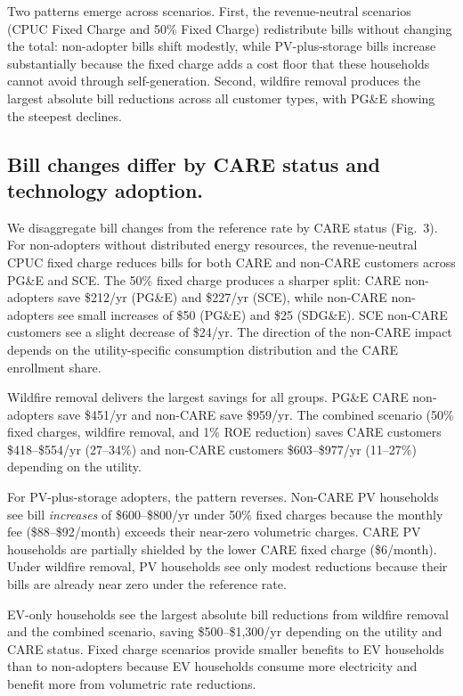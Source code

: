 \documentclass[11pt]{article}
\begin{document}
Two patterns emerge across scenarios. First, the revenue-neutral scenarios (CPUC Fixed Charge and 50\% Fixed Charge) redistribute bills without changing the total: non-adopter bills shift modestly, while PV-plus-storage bills increase substantially because the fixed charge adds a cost floor that these households cannot avoid through self-generation. Second, wildfire removal produces the largest absolute bill reductions across all customer types, with PG\&E showing the steepest declines.

\subsection*{Bill changes differ by CARE status and technology adoption.}

We disaggregate bill changes from the reference rate by CARE status (Fig.~3). For non-adopters without distributed energy resources, the revenue-neutral CPUC fixed charge reduces bills for both CARE and non-CARE customers across PG\&E and SCE. The 50\% fixed charge produces a sharper split: CARE non-adopters save \$212/yr (PG\&E) and \$227/yr (SCE), while non-CARE non-adopters see small increases of \$50 (PG\&E) and \$25 (SDG\&E). SCE non-CARE customers see a slight decrease of \$24/yr. The direction of the non-CARE impact depends on the utility-specific consumption distribution and the CARE enrollment share.

Wildfire removal delivers the largest savings for all groups. PG\&E CARE non-adopters save \$451/yr and non-CARE save \$959/yr. The combined scenario (50\% fixed charges, wildfire removal, and 1\% ROE reduction) saves CARE customers \$418--\$554/yr (27--34\%) and non-CARE customers \$603--\$977/yr (11--27\%) depending on the utility.

For PV-plus-storage adopters, the pattern reverses. Non-CARE PV households see bill \textit{increases} of \$600--\$800/yr under 50\% fixed charges because the monthly fee (\$88--\$92/month) exceeds their near-zero volumetric charges. CARE PV households are partially shielded by the lower CARE fixed charge (\$6/month). Under wildfire removal, PV households see only modest reductions because their bills are already near zero under the reference rate.

EV-only households see the largest absolute bill reductions from wildfire removal and the combined scenario, saving \$500--\$1,300/yr depending on the utility and CARE status. Fixed charge scenarios provide smaller benefits to EV households than to non-adopters because EV households consume more electricity and benefit more from volumetric rate reductions.
\end{document}

